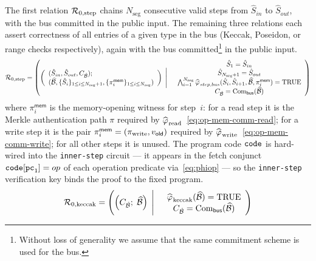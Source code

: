 The first relation $\mathcal{R}_{0,\mathrm{step}}$ chains
$N_{\text{seg}}$ consecutive valid steps
from $\hat{S}_{in}$ to $\hat{S}_{out}$,
with the bus committed in the public input.
The remaining three relations each assert correctness of
all entries of a given type in the bus
(Keccak, Poseidon, or range checks respectively),
again with the bus committed\footnote{Without loss
of generality we assume that the same commitment scheme is used for the bus.} in the public input.
\begin{equation}\label{eq:rel-inner-step}
  \scalebox{0.90}{$\displaystyle
    \relation_{0,\step} =\left(
    \left(\begin{array}{l}
      (\hat{S}_{in},\hat{S}_{out}, C_{\hat{\mathcal{B}}} );\;\\
      (\widehat{\BBB},\{\hat{S}_i\}_{1\leq i \leq {N_{\text{seg}}}+1},
      \{\pi^{\mathsf{mem}}_i\}_{1\leq i\leq N_{\text{seg}}})
    \end{array}\right)\;\Bigg|\quad
    \begin{array}{c}
      \hat{S}_1 = \hat{S}_{in}\\
      \hat{S}_{N_{\text{seg}}+1} = \hat{S}_{out}\\
      \bigwedge_{i=1}^{N_{\text{seg}}} \widehat{\pred{}}_{step,bus} (\hat{S}_i,\hat{S}_{i+1},\widehat{\BBB},\pi^{\mathsf{mem}}_i)=\mathrm{TRUE}\\
      C_{\hat{\mathcal{B}}} = \Com_{\mathsf{bus}}(\widehat{\BBB})
    \end{array}
   \right)
  $}
\end{equation}
where $\pi^{\mathsf{mem}}_i$ is the memory-opening witness for step~$i$: for a read step it is the Merkle authentication path $\pi$ required by $\widehat{\varphi_{\mathrm{}}}_{\mathrm{read}}$~\eqref{eq:op-mem-comm-read}; for a write step it is the pair $\pi^{\mathsf{mem}}_i = (\pi_{\mathrm{write}}, v_{\mathsf{old}})$ required by $\widehat{\varphi_{\mathrm{}}}_{\mathrm{write}}$~\eqref{eq:op-mem-comm-write}; for all other steps it is unused.
The program code $\mathtt{code}$ is hard-wired into the \texttt{inner-step} circuit --- it appears in the fetch conjunct $\mathtt{code}[\mathtt{pc}_1]=op$ of each operation predicate via~\eqref{eq:phiop} --- so the \texttt{inner-step} verification key binds the proof to the fixed program.
\begin{equation}\label{eq:rel-inner-keccak}
  \mathcal{R}_{0,\mathrm{keccak}} =\left(
   \left( C_{\hat{\mathcal{B}}} ;\;
  \widehat{\mathcal{B}} \right)\;\Bigg|\quad
  \begin{array}{c}
    \widehat{\varphi_{\mathrm{}}}_{\mathrm{keccak}}(\widehat{\mathcal{B}})=\mathrm{TRUE}\\
    C_{\hat{\mathcal{B}}} = \mathrm{Com}_{\mathsf{bus}}(\widehat{\mathcal{B}})
  \end{array}
 \right)
\end{equation}
